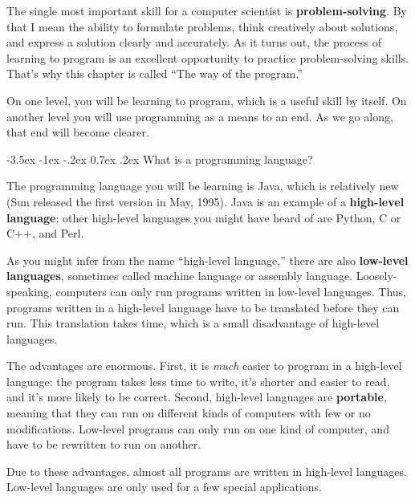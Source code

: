 \documentclass{book}
\makeatletter
\renewcommand{\section}{\@startsection 
    {section} {1} {0mm}%
    {-3.5ex \@plus -1ex \@minus -.2ex}%
    {0.7ex \@plus.2ex}%
    {\normalfont\Large\bfseries}}
\makeatother
\begin{document}
The single most important skill for a computer scientist is {\bf
problem-solving}.  By that I mean the ability to formulate problems,
think creatively about solutions, and express a solution clearly and
accurately.  As it turns out, the process of learning to program is an
excellent opportunity to practice problem-solving skills.  That's why
this chapter is called ``The way of the program.''

On one level, you will be learning to program, which is a useful
skill by itself.  On another level you will use programming
as a means to an end.  As we go along, that end will
become clearer.

\section{What is a programming language?}

The programming language you will be learning is Java, which is
relatively new (Sun released the first version in May, 1995).  Java is
an example of a {\bf high-level language}; other high-level languages
you might have heard of are Python, C or C++, and Perl.

As you might infer from the name ``high-level language,'' there are
also {\bf low-level languages}, sometimes called machine
language or assembly language.  Loosely-speaking, computers can only
run programs written in low-level languages.  Thus, programs
written in a high-level language have to be translated before they can
run.  This translation takes time, which is a small disadvantage
of high-level languages.


The advantages are enormous.  First,
it is {\em much} easier to program in a high-level language:
the program takes less time to write,
it's shorter and easier to read, and it's more likely to be
correct.  Second, high-level languages are {\bf portable},
meaning that they can run on different kinds of computers with
few or no modifications.  Low-level programs can only run
on one kind of computer, and have to be rewritten to run on
another.

Due to these advantages, almost all programs are written in
high-level languages.  Low-level languages are only used for
a few special applications.

\end{document}
